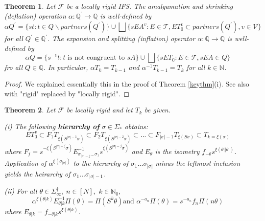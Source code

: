 \documentclass{amsproc}
\newtheorem{theorem}{Theorem}
\theoremstyle{plain}
\theoremstyle{definition}
\numberwithin{equation}{section}
\begin{document}
\begin{theorem}
Let $\mathcal{F}$ be a locally rigid IFS. The amalgamation and shrinking
(deflation) operation $\alpha:\mathbb{Q}^{\prime}\mathbb{\rightarrow Q}$ is
well-defined by 
\begin{equation*}
\alpha Q^{\prime}=\{st:t\in Q\backslash partners(Q^{\prime})\}\cup
\bigsqcup\{sEA^{v}:E\in\mathcal{T},ET_{0}^{v}\subset
partners(Q^{\prime}),v\in\mathcal{V}\}
\end{equation*}
for all $Q^{\prime}\in\mathbb{Q}^{\prime}$. The expansion and splitting
(inflation) operator $\alpha:\mathbb{Q\rightarrow Q}$ is well-defined by%
\begin{equation*}
\alpha Q=\{s^{-1}t:t\text{ is not congruent to }sA\}\cup\bigsqcup
\{sET_{0}:E\in\mathcal{T},sEA\in Q\}
\end{equation*}
fro all $Q\in\mathbb{Q}$. In particular, $\alpha T_{k}=T_{k-1}$ and $%
\alpha^{-1}T_{k-1}=T_{k}$ for all $k\in\mathbb{N}$.
\end{theorem}

\begin{proof}
We explained essentially this in the proof of Theorem \ref{keythm}(i). See
also \cite[Lemmas 6 and 7]{barnsleyvince} with "rigid" replaced by "locally
rigid".
\end{proof}

\begin{theorem}
\label{keythm2}Let $\mathcal{F}$ be locally rigid and let $T_{k}$ be given.

(i) The following \textbf{hierarchy of} $\sigma\in\Sigma_{\ast}$ obtains: 
\begin{equation}
ET_{0}^{v}\subset F_{1}T_{\xi(S^{|\sigma|-1}\sigma)}\subset
F_{2}T_{\xi(S^{|\sigma|-2}\sigma)}\subset...\subset F_{\left\vert
\sigma\right\vert -1}T_{\xi(S\sigma)}\subset T_{k=\xi(\sigma)}
\label{heirarchy}
\end{equation}
where $F_{j}=s^{-\xi(S^{|\sigma|-j}\sigma)}E_{\sigma_{\left\vert
\sigma\right\vert -j}...\sigma_{1}}^{-1}s^{\xi(S^{|\sigma|-j}\sigma)}$ and $%
E_{\theta}$ is the isometry $f_{-\theta}s^{\xi(\theta|\left\vert
\theta\right\vert )}.$ Application of $\alpha^{\xi(\sigma_{\left\vert
\sigma\right\vert })}$ to the hierarchy of $\sigma_{1}...\sigma_{\left\vert
\sigma\right\vert }$ minus the leftmost inclusion yields the heirarchy of $%
\sigma_{1}...\sigma_{\left\vert \sigma\right\vert -1}.$

(ii) For all $\theta\in\Sigma_{\infty}^{\dag}$, $n\in\left[ N\right] ,$ $k\in%
\mathbb{N}_{0},$%
\begin{equation*}
\alpha^{\xi(\theta|k)}E_{\theta|k}^{-1}\Pi(\theta)=\Pi(S^{k}\theta)\text{
and }\alpha^{-a_{n}}\Pi(\theta)=s^{-a_{n}}f_{n}\Pi(n\theta)
\end{equation*}
where $E_{\theta|k}=f_{-\theta|k}s^{\xi(\theta|k)}$.
\end{theorem}
\end{document}
